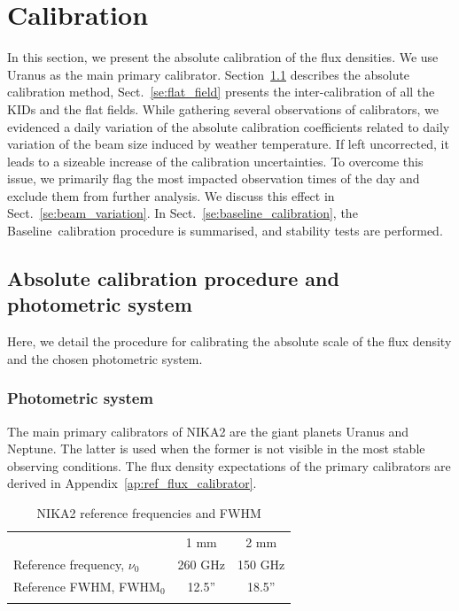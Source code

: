 \documentclass[traditionalabstract]{aa}
\newcommand{\baseline}{Baseline}%
\begin{document}
{%
\section{Calibration}
\label{se:calibration}
%

In this section, we present the absolute calibration of the flux densities. We
use Uranus as the main primary calibrator. Section~\ref{se:calibration_method}
describes the absolute calibration method, Sect.~\ref{se:flat_field} presents
the inter-calibration of all the KIDs and the flat fields. While
gathering several observations of calibrators, we evidenced a
daily variation of the absolute calibration
coefficients related to daily variation of the beam
size induced by weather temperature. If left uncorrected, it leads to
a sizeable increase of the calibration uncertainties. To
overcome this issue, we primarily flag the most impacted observation
times of the day and exclude them from further analysis.
We discuss this effect in
Sect.~\ref{se:beam_variation}. In Sect.~\ref{se:baseline_calibration},
the \baseline\ calibration procedure is summarised, and stability
tests are performed.  



\subsection{Absolute calibration procedure and photometric system}
\label{se:calibration_method}

Here, we detail the procedure for calibrating the absolute scale of
the flux density and the chosen photometric system.

\subsubsection{Photometric system}
\label{se:photometric_system}

The main primary calibrators of NIKA2 are the giant planets Uranus and
Neptune. The latter is used when the former is not visible in the most
stable observing conditions. The flux density expectations of the
primary calibrators are derived in Appendix~\ref{ap:ref_flux_calibrator}. 
%
\begin{table}[!htbp]
\caption{NIKA2 reference frequencies and FWHM}
\label{tab:definitions}
\centering     
\begin{tabular}{lcc}
\hline\hline
      \noalign{\smallskip}
      & 1 mm & 2 mm \\
      \noalign{\smallskip}
      \hline
      \noalign{\smallskip}
      Reference frequency, $\nu_{0}$ & 260 GHz & 150 GHz \\
      Reference FWHM,  FWHM$_{0}$    & 12.5'' & 18.5'' \\
      \noalign{\smallskip}
      \hline
\end{tabular}
\end{table}

}
\end{document}
